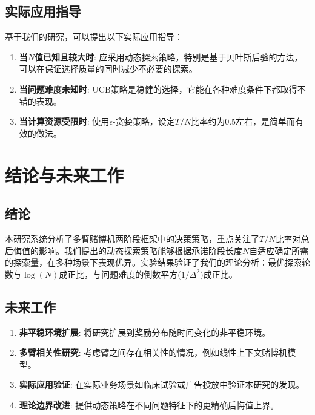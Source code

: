 \documentclass[8pt, a4paper]{ctexart} %
\newcommand{\N}{\ensuremath{N}}
\newcommand{\T}{\ensuremath{T}}
\newcommand{\eps}{\ensuremath{\epsilon}} %
\newcommand{\DeltaVal}{\ensuremath{\Delta}}
\begin{document}
\subsection{实际应用指导}
基于我们的研究，可以提出以下实际应用指导：
\begin{enumerate}
    \item \textbf{当$\N$值已知且较大时}: 应采用动态探索策略，特别是基于贝叶斯后验的方法，可以在保证选择质量的同时减少不必要的探索。
    \item \textbf{当问题难度未知时}: UCB策略是稳健的选择，它能在各种难度条件下都取得不错的表现。
    \item \textbf{当计算资源受限时}: 使用$\eps$-贪婪策略，设定$\T/\N$比率约为0.5左右，是简单而有效的做法。
\end{enumerate}

\section{结论与未来工作}

\subsection{结论}

本研究系统分析了多臂赌博机两阶段框架中的决策策略，重点关注了$\T/\N$比率对总后悔值的影响。我们提出的动态探索策略能够根据承诺阶段长度$\N$自适应确定所需的探索量，在多种场景下表现优异。实验结果验证了我们的理论分析：最优探索轮数与$\log(\N)$成正比，与问题难度的倒数平方($1/\DeltaVal^2$)成正比。

\subsection{未来工作}
\begin{enumerate}
    \item \textbf{非平稳环境扩展}: 将研究扩展到奖励分布随时间变化的非平稳环境。
    \item \textbf{多臂相关性研究}: 考虑臂之间存在相关性的情况，例如线性上下文赌博机模型。
    \item \textbf{实际应用验证}: 在实际业务场景如临床试验或广告投放中验证本研究的发现。
    \item \textbf{理论边界改进}: 提供动态策略在不同问题特征下的更精确后悔值上界。
\end{enumerate}
\end{document}

